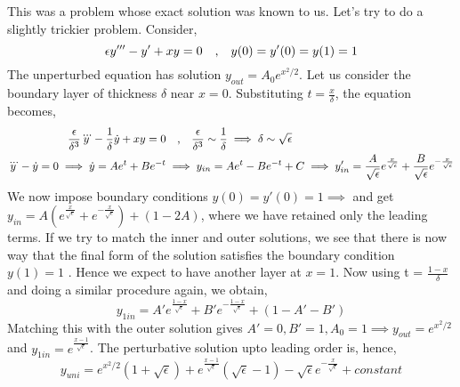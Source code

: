 \documentclass[a4paper,11pt]{article}
\begin{document}
This was a problem whose exact solution was known to us. Let's try to do a slightly trickier problem. Consider,
\begin{equation*}
\epsilon y''' - y' + xy = 0 \qq{,} y(0) = y'(0) = y(1)= 1
\end{equation*}
The unperturbed equation has solution $ y_{out} = A_0 e^{x^2/2} $. Let us consider the boundary layer of thickness $ \delta $ near $ x=0 $. Substituting $ t = \frac{x}{\delta} $, the equation becomes,
\begin{align*}
\dfrac{\epsilon}{\delta^3} \dddot{y} - \dfrac{1}{\delta} \dot{y} + xy = 0 &\qq{,} \dfrac{\epsilon}{\delta^3} \sim \dfrac{1}{\delta} \implies \delta \sim \sqrt{\epsilon} \\
\dddot{y} - \dot{y} = 0 \implies \dot{y} = A e^t + B e^{-t} &\implies y_{in} = A e^t - B e^{-t} + C \implies y_{in}' = \dfrac{A}{\sqrt{\epsilon}} e^{\frac{x}{\sqrt{\epsilon}}} + \dfrac{B}{\sqrt{\epsilon}} e^{-\frac{x}{\sqrt{\epsilon}}}
\end{align*}
We now impose boundary conditions $ y(0)= y'(0) = 1 \implies  $ and get $ y_{in}  = A (e^\frac{x}{\sqrt{\epsilon}} + e^{-\frac{x}{\sqrt{\epsilon}}}) + (1- 2A )$, where we have retained only the leading terms. If we try to match the inner and outer solutions, we see that there is now way that the final form of the solution satisfies the boundary condition $ y(1) = 1 $ . Hence we expect to have another layer at $ x=1 $. Now using t = $\frac{1-x}{\delta}$ and doing a similar procedure again, we obtain,
\begin{equation*}
y_{1in} = A' e^{\frac{1-x}{\sqrt{\epsilon}}} + B' e^{-\frac{1-x}{\sqrt{\epsilon}}} + (1 - A' - B')
\end{equation*}
Matching this with the outer solution gives $ A'=0, B'=1, A_0 = 1  \implies y_{out} = e^{x^2/2} $ and $ y_{1in} = e^{\frac{x-1}{\sqrt
\epsilon}} $. The perturbative solution upto leading order is, hence,
\begin{equation*}
y_{uni} = e^{x^2/2} (1 + \sqrt{\epsilon}) + e^{\frac{x-1}{\sqrt{\epsilon}}} (\sqrt{\epsilon }-1) - \sqrt{\epsilon} e^{-\frac{x}{\sqrt{\epsilon}}} + constant
\end{equation*}
\end{document}
